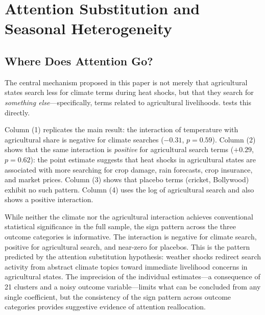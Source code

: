 \documentclass[12pt]{article}
\begin{document}
\section{Attention Substitution and Seasonal Heterogeneity}
\label{sec:mechanism}

\subsection{Where Does Attention Go?}

The central mechanism proposed in this paper is not merely that agricultural states search less for climate terms during heat shocks, but that they search for \textit{something else}---specifically, terms related to agricultural livelihoods.  tests this directly.

Column (1) replicates the main result: the interaction of temperature with agricultural share is negative for climate searches ($-0.31$, $p = 0.59$). Column (2) shows that the same interaction is \textit{positive} for agricultural search terms ($+0.29$, $p = 0.62$): the point estimate suggests that heat shocks in agricultural states are associated with more searching for crop damage, rain forecasts, crop insurance, and market prices. Column (3) shows that placebo terms (cricket, Bollywood) exhibit no such pattern. Column (4) uses the log of agricultural search and also shows a positive interaction.



While neither the climate nor the agricultural interaction achieves conventional statistical significance in the full sample, the sign pattern across the three outcome categories is informative. The interaction is negative for climate search, positive for agricultural search, and near-zero for placebos. This is the pattern predicted by the attention substitution hypothesis: weather shocks redirect search activity from abstract climate topics toward immediate livelihood concerns in agricultural states. The imprecision of the individual estimates---a consequence of 21 clusters and a noisy outcome variable---limits what can be concluded from any single coefficient, but the consistency of the sign pattern across outcome categories provides suggestive evidence of attention reallocation.
\end{document}
